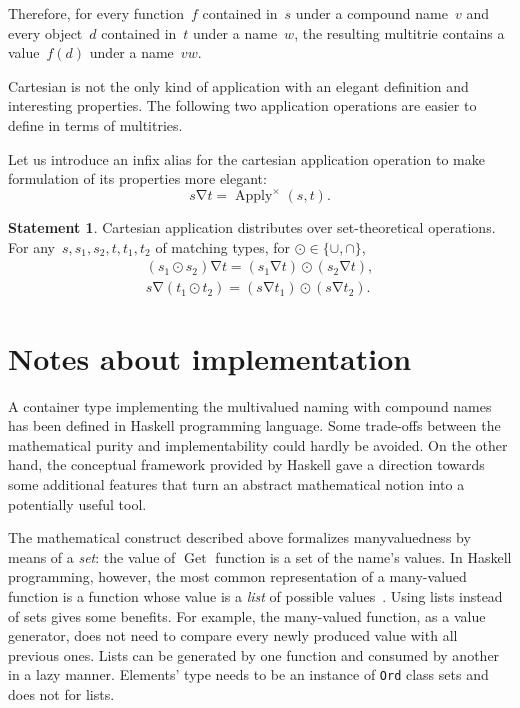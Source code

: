 \documentclass{article}
\theoremstyle{definition}
\newtheorem{St}{Statement}
\newcommand{\deref}{\operatorname{Get}}
\newcommand{\apply}{\operatorname{Apply}}
\newcommand{\inapply}{\mathbin{\nabla}}
\begin{document}
Therefore, for every function~$f$ contained in~$s$ under a compound name~$v$
and every object~$d$ contained in~$t$ under a name~$w$, the resulting
multitrie contains a value~$f(d)$ under a name~$vw$.

Cartesian is not the only kind of application with an elegant definition and
interesting properties.  The following two application operations are
easier to define in terms of multitries.

Let us introduce an infix alias for the cartesian application operation to make
formulation of its properties more elegant:
\[
  s \inapply t = \apply^{\times} (s, t) .
\]

\begin{St}\label{st:apply-distr}
Cartesian application distributes over set-theoretical operations.
For any~$s, s_1, s_2, t, t_1, t_2$ of matching types,
for $\odot \in \{\cup, \cap \}$,
\begin{eqnarray*}
  (s_1 \odot s_2) \inapply t =
    (s_1 \inapply t) \odot (s_2 \inapply t) , \\
  s \inapply (t_1 \odot t_2) =
    (s \inapply t_1) \odot (s \inapply t_2) .
\end{eqnarray*}
\end{St}


\section{Notes about implementation}

A container type implementing the multivalued naming with compound names has
been defined in Haskell programming language. Some trade-offs between the
mathematical purity and implementability could hardly be avoided. On the other
hand, the conceptual framework provided by Haskell gave a
direction towards some additional features that turn an abstract mathematical
notion into a potentially useful tool.

The mathematical construct described above formalizes manyvaluedness by means
of a \emph{set}: the value of $\deref$ function is a set of the name's values.
In Haskell programming, however, the most common representation of a many-valued
function is a function whose value is a \emph{list} of possible
values~\cite[p.~285]{bib:lipovaca}.  Using lists instead of sets gives some
benefits. For example, the many-valued function, as a value generator, does not
need to compare every newly produced value with all previous ones. Lists can be
generated by one function and consumed by another in a lazy manner. Elements'
type needs to be an instance of \lstinline{Ord} class sets and does not for
lists.
\end{document}
